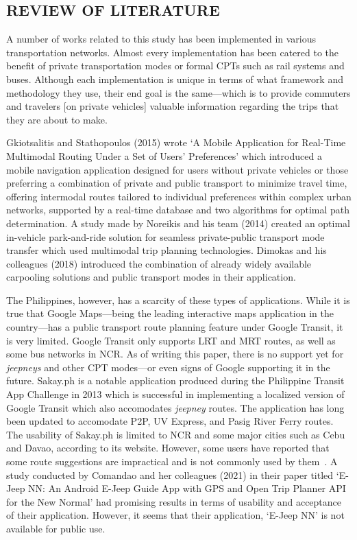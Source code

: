 \documentclass{icsthesis}
\begin{document}
\begin{mainmatter}
		
		\section{REVIEW OF LITERATURE}
		A number of works related to this study has been implemented in various transportation networks. Almost every implementation has been catered to the benefit of private transportation modes or formal CPTs such as rail systems and buses.
		Although each implementation is unique in terms of what framework and methodology they use, their end goal is the same---which is to provide commuters and travelers [on private vehicles] valuable information regarding the trips that they are about to make.
		
		Gkiotsalitis and Stathopoulos (2015) wrote `A Mobile Application for Real-Time Multimodal Routing Under a Set of Users’ Preferences' which introduced a mobile navigation application designed for users without private vehicles or those preferring a combination of private and public transport to minimize travel time, offering intermodal routes tailored to individual preferences within complex urban networks, supported by a real-time database and two algorithms for optimal path determination.
		A study made by Noreikis and his team (2014) created an optimal in-vehicle park-and-ride solution for seamless private-public transport mode transfer which used multimodal trip planning technologies.
		Dimokas and his colleagues (2018) introduced the combination of already widely available carpooling solutions and public transport modes in their application.
		
		The Philippines, however, has a scarcity of these types of applications. While it is true that Google Maps---being the leading interactive maps application in the country---has a public transport route planning feature under Google Transit, it is very limited.
		Google Transit only supports LRT and MRT routes, as well as some bus networks in NCR\@.
		As of writing this paper, there is no support yet for \textit{jeepneys} and other CPT modes---or even signs of Google supporting it in the future.
		Sakay.ph is a notable application produced during the Philippine Transit App Challenge in 2013 which is successful in implementing a localized version of Google Transit which also accomodates \textit{jeepney} routes.
		The application has long been updated to accomodate P2P, UV Express, and Pasig River Ferry routes. The usability of Sakay.ph is limited to NCR and some major cities such as Cebu and Davao, according to its website. However, some users have reported that some route suggestions are impractical and is not commonly used by them~\citep{Narboneta15}.
		A study conducted by Comandao and her colleagues (2021) in their paper titled `E-Jeep NN\@: An Android E-Jeep Guide App with GPS and Open Trip Planner API for the New Normal' had promising results in terms of usability and acceptance of their application.
		However, it seems that their application, `E-Jeep NN' is not available for public use.
		

\end{mainmatter}
\end{document}
